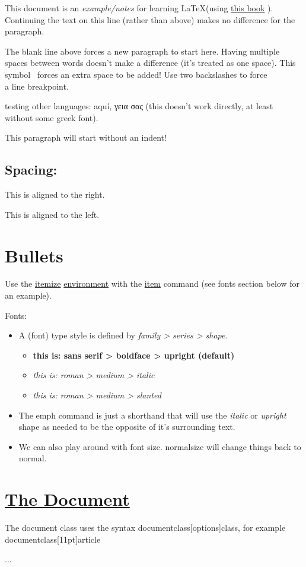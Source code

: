 \documentclass{article}
\begin{document}
This document is an \emph{example/notes} for learning \LaTeX (using \href{https://www.tug.org/twg/mactex/tutorials/ltxprimer-1.0.pdf}{this book} ).
Continuing the text on this line (rather than above) makes no difference for the paragraph.

The blank line above forces a new paragraph to start here.
Having multiple         spaces between words doesn't make a difference (it's treated as one space).
This symbol \ forces an extra space to be added!
Use two backslashes to force\\
a line breakpoint.

testing other languages: aquí, γεια σας (this doesn't work directly, at least without some greek font).


\noindent This paragraph will start without an indent!


\begin{center}
  \section{Spacing:}
\end{center}

\begin{flushright}
  This is aligned to the right.
\end{flushright}
\begin{flushleft}
  This is aligned to the left.
\end{flushleft}


\section{Bullets}
Use the \underline{itemize} \href{https://www.overleaf.com/learn/latex/Environments}{environment} with the \underline{item} command (see fonts section below for an example).


\begin{center}
  Fonts:
\end{center}


\begin{itemize}
  \item A (font) type style is defined by \emph{family > series > shape}.
  \begin{itemize}
    \item \textsf{\textbf{this is: sans serif > boldface > upright (default)}}
    \item \textrm{\textmd{\textit{this is: roman > medium > italic}}}
    \item \textrm{\textmd{\textsl{this is: roman > medium > slanted}}}
  \end{itemize}

  \item The emph command is just a shorthand that will use the \emph{italic} or \emph{upright} shape as needed to be the opposite of it's surrounding text.
  \item We \tiny{can} also \scriptsize{play around} with \huge{font size}.  normalsize will \normalsize{} change things back to normal.
\end{itemize}


\section{
  \href{https://libguides.utsa.edu/c.php?g=522165&p=3570198}{The Document}
}
The document class uses the syntax documentclass[options]{class}, for example documentclass[11pt]{article}

...
\end{document}
